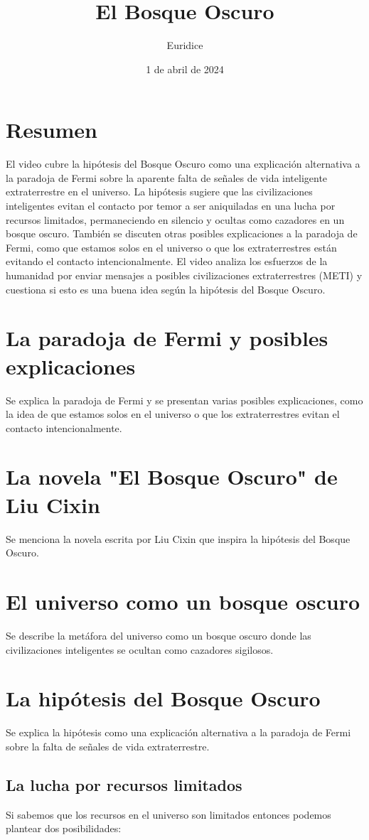 \documentclass[12pt a4paper]{article}
\title{El Bosque Oscuro}
\author{Euridice}
\date{1 de abril de 2024}
\begin{document}
\maketitle
\section{Resumen}
El video cubre la hipótesis del Bosque Oscuro como una explicación alternativa a la paradoja de Fermi sobre la aparente falta de señales de vida inteligente extraterrestre en el universo. La hipótesis sugiere que las civilizaciones inteligentes evitan el contacto por temor a ser aniquiladas en una lucha por recursos limitados, permaneciendo en silencio y ocultas como cazadores en un bosque oscuro. También se discuten otras posibles explicaciones a la paradoja de Fermi, como que estamos solos en el universo o que los extraterrestres están evitando el contacto intencionalmente. El video analiza los esfuerzos de la humanidad por enviar mensajes a posibles civilizaciones extraterrestres (METI) y cuestiona si esto es una buena idea según la hipótesis del Bosque Oscuro.
\section{La paradoja de Fermi y posibles explicaciones}
Se explica la paradoja de Fermi y se presentan varias posibles explicaciones, como la idea de que estamos solos en el universo o que los extraterrestres evitan el contacto intencionalmente.
\section{La novela "El Bosque Oscuro" de Liu Cixin}
Se menciona la novela escrita por Liu Cixin que inspira la hipótesis del Bosque Oscuro.
\section{El universo como un bosque oscuro}
Se describe la metáfora del universo como un bosque oscuro donde las civilizaciones inteligentes se ocultan como cazadores sigilosos.
\section{La hipótesis del Bosque Oscuro}
Se explica la hipótesis como una explicación alternativa a la paradoja de Fermi sobre la falta de señales de vida extraterrestre.
\subsection{La lucha por recursos limitados}
Si sabemos que los recursos en el universo son limitados entonces podemos plantear dos posibilidades:
\end{document}
